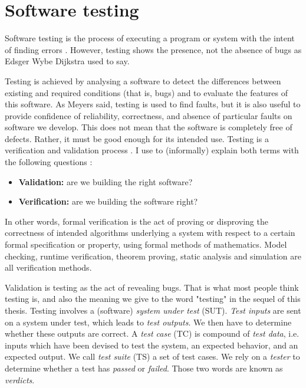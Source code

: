 \section{Software testing}
\label{sec:related:testing}

Software testing is the process of executing a program or system
with the intent of finding errors \cite{Myers:1979:AST:539883}.
However, testing shows the presence, not the absence of bugs as
Edsger Wybe Dijkstra used to say.

Testing is achieved by analysing a software to detect the
differences between existing and required conditions (that is,
bugs) and to evaluate the features of this software. As Meyers
said, testing is used to find faults, but it is also useful to
provide confidence of reliability, correctness, and absence of
particular faults on software we develop. This does not mean that
the software is completely free of defects. Rather, it must be
good enough for its intended use.
Testing is a verification and validation process
\cite{wallace1989software}. I use to (informally) explain both
terms with the following questions \cite{Boehm1979}:

\begin{itemize}
\item \textbf{Validation:} are we building the right software?
\item \textbf{Verification:} are we building the software right?
\end{itemize}

In other words, formal verification is the act of proving or
disproving the correctness of intended algorithms underlying a
system with respect to a certain formal specification or
property, using formal methods of mathematics. Model checking,
runtime verification, theorem proving, static analysis and
simulation are all verification methods.

Validation is testing as the act of revealing bugs. That is what
most people think testing is, and also the meaning we give to the
word "testing" in the sequel of this thesis. Testing involves a
(software) \textit{system under test} (SUT). \textit{Test inputs}
are sent on a system under test, which leads to \textit{test
outputs}. We then have to determine whether these outputs are
correct. A \textit{test case} (TC) is compound of \textit{test
data}, i.e.  inputs which have been devised to test the system,
an expected behavior, and an expected output. We call
\textit{test suite} (TS) a set of test cases. We rely on a
\textit{tester} to determine whether a test has \textit{passed}
or \textit{failed}. Those two words are known as
\textit{verdicts}.

